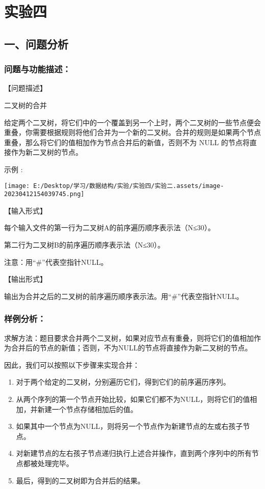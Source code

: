 \documentclass[
]{article}
\author{}
\date{}
\begin{document}
\hypertarget{ux5b9eux9a8cux56db}{%
\section{实验四}\label{ux5b9eux9a8cux56db}}

\hypertarget{ux4e00ux95eeux9898ux5206ux6790}{%
\subsection{一、问题分析}\label{ux4e00ux95eeux9898ux5206ux6790}}

\hypertarget{ux95eeux9898ux4e0eux529fux80fdux63cfux8ff0}{%
\subsubsection{问题与功能描述：}\label{ux95eeux9898ux4e0eux529fux80fdux63cfux8ff0}}

【问题描述】

二叉树的合并

给定两个二叉树，将它们中的一个覆盖到另一个上时，两个二叉树的一些节点便会重叠，你需要根据规则将他们合并为一个新的二叉树。合并的规则是如果两个节点重叠，那么将它们的值相加作为节点合并后的新值，否则不为
NULL 的节点将直接作为新二叉树的节点。

示例 :

\texttt{[image: E:/Desktop/学习/数据结构/实验/实验四/实验二.assets/image-20230412154039745.png]}

【输入形式】

每个输入文件的第一行为二叉树A的前序遍历顺序表示法（N≤30）。

第二行为二叉树B的前序遍历顺序表示法（N≤30）。

注意：用``\#''代表空指针NULL。

【输出形式】

输出为合并之后的二叉树的前序遍历顺序表示法。用``\#''代表空指针NULL。

\hypertarget{ux6837ux4f8bux5206ux6790}{%
\subsubsection{样例分析：}\label{ux6837ux4f8bux5206ux6790}}

求解方法：题目要求合并两个二叉树，如果对应节点有重叠，则将它们的值相加作为合并后的节点的新值；否则，不为NULL的节点将直接作为新二叉树的节点。

因此，我们可以按照以下步骤来实现合并：

\begin{enumerate}
\def\labelenumi{\arabic{enumi}.}
\item
  对于两个给定的二叉树，分别遍历它们，得到它们的前序遍历序列。
\item
  从两个序列的第一个节点开始比较，如果它们都不为NULL，则将它们的值相加，并新建一个节点存储相加后的值。
\item
  如果其中一个节点为NULL，则将另一个节点作为新建节点的左或右孩子节点。
\item
  对新建节点的左右孩子节点递归执行上述合并操作，直到两个序列中的所有节点都被处理完毕。
\item
  最后，得到的二叉树即为合并后的结果。
\end{enumerate}
\end{document}
